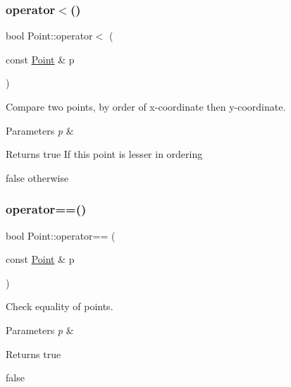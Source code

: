 \subsubsection{\texorpdfstring{operator$<$()}{operator<()}}
{\footnotesize\ttfamily bool Point\+::operator$<$ (\begin{DoxyParamCaption}\item[{const \mbox{\hyperlink{classPoint}{Point}} \&}]{p }\end{DoxyParamCaption})\hspace{0.3cm}{\ttfamily [inline]}}



Compare two points, by order of x-\/coordinate then y-\/coordinate. 


\begin{DoxyParams}{Parameters}
{\em p} & \\
\hline
\end{DoxyParams}
\begin{DoxyReturn}{Returns}
true If \textquotesingle{}this\textquotesingle{} point is lesser in ordering 

false otherwise 
\end{DoxyReturn}
\mbox{\label{classPoint_a1a69a0a1dea189f07e044f6eb868937d}} 
\subsubsection{\texorpdfstring{operator==()}{operator==()}}
{\footnotesize\ttfamily bool Point\+::operator== (\begin{DoxyParamCaption}\item[{const \mbox{\hyperlink{classPoint}{Point}} \&}]{p }\end{DoxyParamCaption})\hspace{0.3cm}{\ttfamily [inline]}}



Check equality of points. 


\begin{DoxyParams}{Parameters}
{\em p} & \\
\hline
\end{DoxyParams}
\begin{DoxyReturn}{Returns}
true 

false 
\end{DoxyReturn}
\mbox{\label{classPoint_a16b12efe91681c389f0546a74fdf0886}} 
